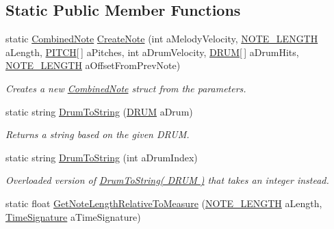 \subsection*{Static Public Member Functions}
\begin{DoxyCompactItemize}
\item 
static \hyperlink{group___music_structs_struct_music_1_1_combined_note}{Combined\+Note} \hyperlink{group___music_stat_func_gaaf74885e43eb623f64f961985fadcd08}{Create\+Note} (int a\+Melody\+Velocity, \hyperlink{group___music_enums_gaf11b5f079adbb21c800b9eca1c5c3cbd}{N\+O\+T\+E\+\_\+\+L\+E\+N\+G\+TH} a\+Length, \hyperlink{group___music_enums_ga508f69b199ea518f935486c990edac1d}{P\+I\+T\+CH}\mbox{[}$\,$\mbox{]} a\+Pitches, int a\+Drum\+Velocity, \hyperlink{group___music_enums_gade475b4382c7066d1af13e7c13c029b6}{D\+R\+UM}\mbox{[}$\,$\mbox{]} a\+Drum\+Hits, \hyperlink{group___music_enums_gaf11b5f079adbb21c800b9eca1c5c3cbd}{N\+O\+T\+E\+\_\+\+L\+E\+N\+G\+TH} a\+Offset\+From\+Prev\+Note)
\begin{DoxyCompactList}\small\item\em Creates a new \hyperlink{group___music_structs_struct_music_1_1_combined_note}{Combined\+Note} struct from the parameters. \end{DoxyCompactList}\item 
static string \hyperlink{group___music_stat_func_gaf5f64ebe9a7e036e07f283e41f26d22b}{Drum\+To\+String} (\hyperlink{group___music_enums_gade475b4382c7066d1af13e7c13c029b6}{D\+R\+UM} a\+Drum)
\begin{DoxyCompactList}\small\item\em Returns a string based on the given D\+R\+UM. \end{DoxyCompactList}\item 
static string \hyperlink{group___music_stat_func_gab74179676b93b41cde2d1cc18af0e788}{Drum\+To\+String} (int a\+Drum\+Index)
\begin{DoxyCompactList}\small\item\em Overloaded version of \hyperlink{group___music_stat_func_gaf5f64ebe9a7e036e07f283e41f26d22b}{Drum\+To\+String( D\+R\+U\+M )} that takes an integer instead. \end{DoxyCompactList}\item 
static float \hyperlink{group___music_stat_func_ga91e290b48ad2289493ba4421308abe49}{Get\+Note\+Length\+Relative\+To\+Measure} (\hyperlink{group___music_enums_gaf11b5f079adbb21c800b9eca1c5c3cbd}{N\+O\+T\+E\+\_\+\+L\+E\+N\+G\+TH} a\+Length, \hyperlink{group___music_structs_struct_music_1_1_time_signature}{Time\+Signature} a\+Time\+Signature)

\end{DoxyCompactItemize}
